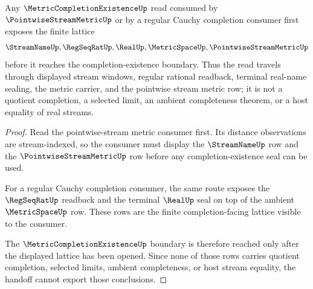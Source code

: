 \begin{theorem}
\label{thm:metric-completion-existence-pointwise-stream-metric-lattice-route}
Any $\MetricCompletionExistenceUp$ read consumed by $\PointwiseStreamMetricUp$ or by a regular Cauchy completion consumer first exposes the finite lattice
$$
\StreamNameUp,\RegSeqRatUp,\RealUp,\MetricSpaceUp,\PointwiseStreamMetricUp
$$
before it reaches the completion-existence boundary. Thus the read travels through displayed stream windows, regular rational readback, terminal real-name sealing, the metric carrier, and the pointwise stream metric row; it is not a quotient completion, a selected limit, an ambient completeness theorem, or a host equality of real streams.
\end{theorem}
\begin{proof}
Read the pointwise-stream metric consumer first. Its distance observations are stream-indexed, so the consumer must display the $\StreamNameUp$ row and the $\PointwiseStreamMetricUp$ row before any completion-existence seal can be used.

For a regular Cauchy completion consumer, the same route exposes the $\RegSeqRatUp$ readback and the terminal $\RealUp$ seal on top of the ambient $\MetricSpaceUp$ row. These rows are the finite completion-facing lattice visible to the consumer.

The $\MetricCompletionExistenceUp$ boundary is therefore reached only after the displayed lattice has been opened. Since none of those rows carries quotient completion, selected limits, ambient completeness, or host stream equality, the handoff cannot export those conclusions.
\end{proof}

